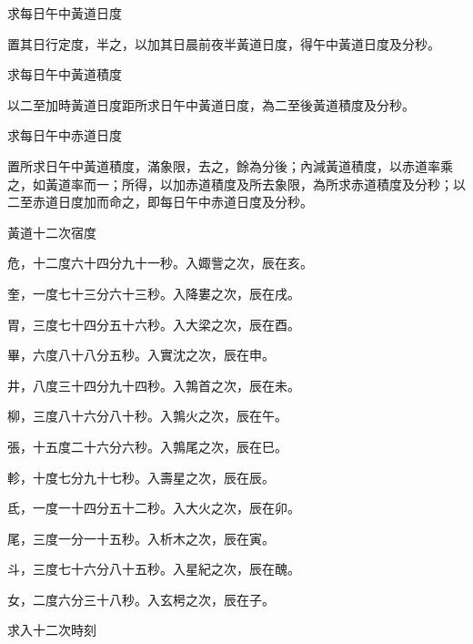\begin{pinyinscope}
 求每日午中黃道日度



 置其日行定度，半之，以加其日晨前夜半黃道日度，得午中黃道日度及分秒。



 求每日午中黃道積度



 以二至加時黃道日度距所求日午中黃道日度，為二至後黃道積度及分秒。



 求每日午中赤道日度



 置所求日午中黃道積度，滿象限，去之，餘為分後；內減黃道積度，以赤道率乘之，如黃道率而一；所得，以加赤道積度及所去象限，為所求赤道積度及分秒；以二至赤道日度加而命之，即每日午中赤道日度及分秒。



 黃道十二次宿度



 危，十二度六十四分九十一秒。入娵訾之次，辰在亥。



 奎，一度七十三分六十三秒。入降婁之次，辰在戌。



 胃，三度七十四分五十六秒。入大梁之次，辰在酉。



 畢，六度八十八分五秒。入實沈之次，辰在申。



 井，八度三十四分九十四秒。入鶉首之次，辰在未。



 柳，三度八十六分八十秒。入鶉火之次，辰在午。



 張，十五度二十六分六秒。入鶉尾之次，辰在巳。



 軫，十度七分九十七秒。入壽星之次，辰在辰。



 氐，一度一十四分五十二秒。入大火之次，辰在卯。



 尾，三度一分一十五秒。入析木之次，辰在寅。



 斗，三度七十六分八十五秒。入星紀之次，辰在醜。



 女，二度六分三十八秒。入玄枵之次，辰在子。



 求入十二次時刻




\end{pinyinscope}
